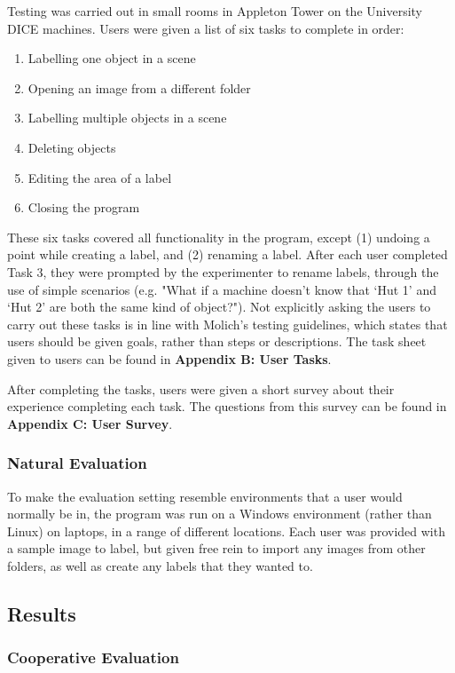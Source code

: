 \documentclass[11pt,twocolumn]{article}
\begin{document}
Testing was carried out in small rooms in Appleton Tower on the University DICE machines. Users were given a list of six tasks to complete in order: 

\begin{enumerate}
\item Labelling one object in a scene
\item Opening an image from a different folder
\item Labelling multiple objects in a scene
\item Deleting objects
\item Editing the area of a label
\item Closing the program
\end{enumerate}
 
These six tasks covered all functionality in the program, except (1) undoing a point while creating a label, and (2) renaming a label. After each user completed Task 3, they were prompted by the experimenter to rename labels, through the use of simple scenarios (e.g. "What if a machine doesn't know that `Hut 1' and `Hut 2' are both the same kind of object?"). Not explicitly asking the users to carry out these tasks is in line with Molich's \cite{molich} testing guidelines, which states that users should be given goals, rather than steps or descriptions. The task sheet given to users can be found in {\bf Appendix B: User Tasks}.

After completing the tasks, users were given a short survey about their experience completing each task. The questions from this survey can be found in {\bf Appendix C: User Survey}.

\subsubsection{Natural Evaluation}

To make the evaluation setting resemble environments that a user would normally be in, the program was run on a Windows environment (rather than Linux) on laptops, in a range of different locations. Each user was provided with a sample image to label, but given free rein to import any images from other folders, as well as create any labels that they wanted to.  

\subsection{Results}

\subsubsection{Cooperative Evaluation}
\end{document}
